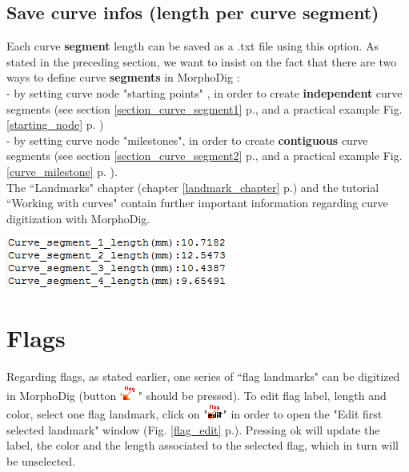 \subsection{Save curve infos (length per curve segment)}
\begin{minipage}{0.55\textwidth}

Each curve \textbf{segment} length can be saved as a .txt file using this option. 
As stated in the preceding section, we want to insist on the fact that there are two ways to define curve \textbf{segments} in MorphoDig : \\
- by setting curve node "starting points" , in order to create \textbf{independent} curve segments (see section \ref{section_curve_segment1} p.\pageref{section_curve_segment1}, and a practical example Fig. \ref{starting_node} p. \pageref{starting_node})\\
- by setting curve node "milestones", in order to create \textbf{contiguous} curve segments (see section \ref{section_curve_segment2} p.\pageref{section_curve_segment2}, and a practical example Fig. \ref{curve_milestone} p. \pageref{curve_milestone}).\\

The ``Landmarks" chapter (chapter \ref{landmark_chapter} p.\pageref{landmark_chapter}) and the
tutorial ``Working with curves" contain further important
information regarding curve digitization with MorphoDig.

\end{minipage}  
 \begin{minipage}{0.45\textwidth}\centering
  \includegraphics[scale=0.5]{images/07/curves/Curve_infos.png}
 \end{minipage} 

\section{Flags}

Regarding flags, as stated earlier, one series of ``flag landmarks" can be digitized in MorphoDig (button `\includegraphics[scale=0.7]{images/04/flag_landmarks.png}" should
be pressed). To edit flag label, length and color, select one
flag landmark, click on "\includegraphics[scale=0.7]{images/06/objects/flag_edit.png}" in order to open the "Edit first selected landmark" window (Fig. \ref{flag_edit} p.\pageref{flag_edit}). Pressing ok will update the label, the color and the length associated to the selected flag, which in turn will be unselected. 

